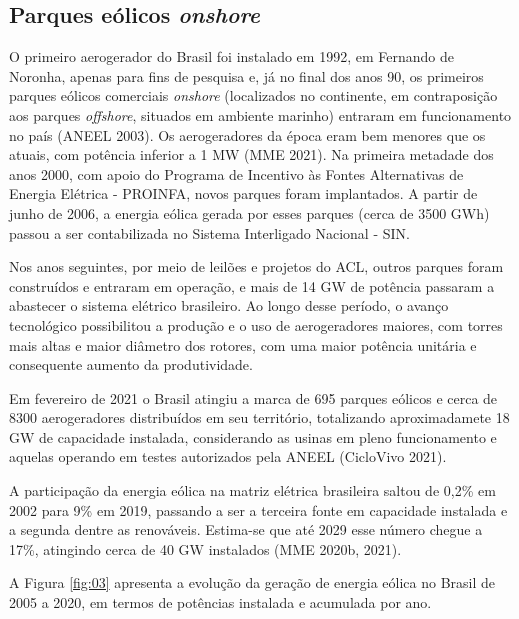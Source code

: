 \documentclass[
  oneside]{scrbook}
\begin{document}
\hypertarget{parques-euxf3licos-onshore}{%
\subsection{\texorpdfstring{Parques eólicos \emph{onshore}}{Parques eólicos onshore}}\label{parques-euxf3licos-onshore}}

O primeiro aerogerador do Brasil foi instalado em 1992, em Fernando de Noronha, apenas para fins de pesquisa e, já no final dos anos 90, os primeiros parques eólicos comerciais \emph{onshore} (localizados no continente, em contraposição aos parques \emph{offshore}, situados em ambiente marinho) entraram em funcionamento no país (ANEEL 2003). Os aerogeradores da época eram bem menores que os atuais, com potência inferior a 1 MW (MME 2021). Na primeira metadade dos anos 2000, com apoio do Programa de Incentivo às Fontes Alternativas de Energia Elétrica - PROINFA, novos parques foram implantados. A partir de junho de 2006, a energia eólica gerada por esses parques (cerca de 3500 GWh) passou a ser contabilizada no Sistema Interligado Nacional - SIN.

Nos anos seguintes, por meio de leilões e projetos do ACL, outros parques foram construídos e entraram em operação, e mais de 14 GW de potência passaram a abastecer o sistema elétrico brasileiro. Ao longo desse período, o avanço tecnológico possibilitou a produção e o uso de aerogeradores maiores, com torres mais altas e maior diâmetro dos rotores, com uma maior potência unitária e consequente aumento da produtividade.

Em fevereiro de 2021 o Brasil atingiu a marca de 695 parques eólicos e cerca de 8300 aerogeradores distribuídos em seu território, totalizando aproximadamete 18 GW de capacidade instalada, considerando as usinas em pleno funcionamento e aquelas operando em testes autorizados pela ANEEL (CicloVivo 2021).

A participação da energia eólica na matriz elétrica brasileira saltou de 0,2\% em 2002 para 9\% em 2019, passando a ser a terceira fonte em capacidade instalada e a segunda dentre as renováveis. Estima-se que até 2029 esse número chegue a 17\%, atingindo cerca de 40 GW instalados (MME 2020b, 2021).

A Figura \ref{fig:03} apresenta a evolução da geração de energia eólica no Brasil de 2005 a 2020, em termos de potências instalada e acumulada por ano.
\end{document}
